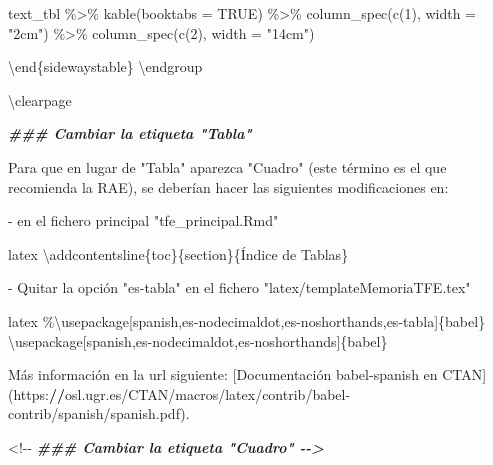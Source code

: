 \documentclass[11pt,a4paper,oneside,]{article}
\newenvironment{Shaded}{\begin{snugshade}}{\end{snugshade}}
\newcommand{\AttributeTok}[1]{\textcolor[rgb]{0.77,0.63,0.00}{#1}}
\newcommand{\DocumentationTok}[1]{\textcolor[rgb]{0.56,0.35,0.01}{\textbf{\textit{#1}}}}
\newcommand{\ErrorTok}[1]{\textcolor[rgb]{0.64,0.00,0.00}{\textbf{#1}}}
\newcommand{\NormalTok}[1]{#1}
\newcommand{\SpecialCharTok}[1]{\textcolor[rgb]{0.00,0.00,0.00}{#1}}
\newcommand{\StringTok}[1]{\textcolor[rgb]{0.31,0.60,0.02}{#1}}
\numberwithin{dummy}{section}
\theoremstyle{ocrenumbox}
\theoremstyle{blacknumex}
\theoremstyle{blacknumbox}
\theoremstyle{ocrenum}
\theoremstyle{ocrenum}
\begin{document}
\begin{Shaded}
\begin{Highlighting}[numbers=left,,firstnumber=701,]
\AttributeTok{text\_tbl \%\textgreater{}\%}
\AttributeTok{  kable(booktabs = TRUE) \%\textgreater{}\% }
\AttributeTok{      column\_spec(c(1), width = "2cm") \%\textgreater{}\% }
\AttributeTok{      column\_spec(c(2), width = "14cm")}

\StringTok{\textasciigrave{}\textasciigrave{}\textasciigrave{}}
\NormalTok{\textbackslash{}end\{sidewaystable\}}
\NormalTok{\textbackslash{}endgroup}

\NormalTok{\textbackslash{}clearpage}



\DocumentationTok{\#\#\# Cambiar la etiqueta "Tabla"}

\NormalTok{Para que en lugar de }\StringTok{"Tabla"}\NormalTok{ aparezca }\StringTok{"Cuadro"}\NormalTok{ (este término es el que recomienda la RAE), se deberían hacer las siguientes modificaciones en}\SpecialCharTok{:} 

\SpecialCharTok{{-}}\NormalTok{ en el fichero principal }\StringTok{"tfe\_principal.Rmd"}

    \StringTok{\textasciigrave{}\textasciigrave{}\textasciigrave{}}\AttributeTok{latex}
\AttributeTok{    }\SpecialCharTok{\textbackslash{}a}\AttributeTok{ddcontentsline\{toc\}\{section\}\{Índice de Tablas\}}
\AttributeTok{    }\StringTok{\textasciigrave{}\textasciigrave{}\textasciigrave{}}

\SpecialCharTok{{-}}\NormalTok{ Quitar la opción }\StringTok{"es{-}tabla"}\NormalTok{ en el fichero }\StringTok{"latex/templateMemoriaTFE.tex"} 

    \StringTok{\textasciigrave{}\textasciigrave{}\textasciigrave{}}\AttributeTok{latex}
\AttributeTok{    \%\textbackslash{}usepackage[spanish,es{-}nodecimaldot,es{-}noshorthands,es{-}tabla]\{babel\}}
\AttributeTok{    \textbackslash{}usepackage[spanish,es{-}nodecimaldot,es{-}noshorthands]\{babel\}}
\AttributeTok{    }\StringTok{\textasciigrave{}\textasciigrave{}\textasciigrave{}}

\NormalTok{Más información en la url siguiente}\SpecialCharTok{:}\NormalTok{ [Documentación babel}\SpecialCharTok{{-}}\NormalTok{spanish en CTAN](https}\SpecialCharTok{:}\ErrorTok{//}\NormalTok{osl.ugr.es}\SpecialCharTok{/}\NormalTok{CTAN}\SpecialCharTok{/}\NormalTok{macros}\SpecialCharTok{/}\NormalTok{latex}\SpecialCharTok{/}\NormalTok{contrib}\SpecialCharTok{/}\NormalTok{babel}\SpecialCharTok{{-}}\NormalTok{contrib}\SpecialCharTok{/}\NormalTok{spanish}\SpecialCharTok{/}\NormalTok{spanish.pdf).}

\SpecialCharTok{\textless{}!{-}{-}} \DocumentationTok{\#\#\# Cambiar la etiqueta "Cuadro" {-}{-}\textgreater{}}


\end{Highlighting}
\end{Shaded}
\end{document}
